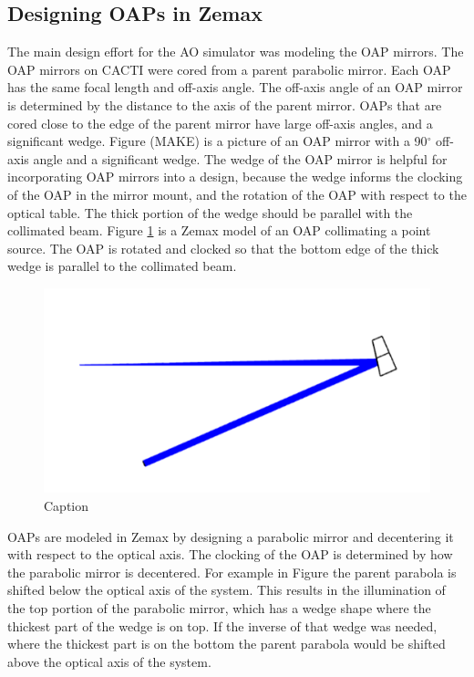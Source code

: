 
\subsection{Designing OAPs in Zemax}
The main design effort for the AO simulator was modeling the OAP mirrors. The OAP mirrors on CACTI were cored from a parent parabolic mirror. Each OAP has the same focal length and off-axis angle. The off-axis angle of an OAP mirror is determined by the distance to the axis of the parent mirror. OAPs that are cored close to the edge of the parent mirror have large off-axis angles, and a significant wedge. Figure (MAKE) is a picture of an OAP mirror with a 90$^{\circ}$ off-axis angle and a significant wedge. The wedge of the OAP mirror is helpful for incorporating OAP mirrors into a design, because the wedge informs the clocking of the OAP in the mirror mount, and the rotation of the OAP with respect to the optical table. The thick portion of the wedge should be parallel with the collimated beam. Figure \ref{fig:OAPcol} is a Zemax model of an OAP collimating a point source. The OAP is rotated and clocked so that the bottom edge of the thick wedge is parallel to the collimated beam. 


\begin{figure}
    \centering
    \includegraphics{Chapter Materials/Chapter Five Materials/OAPcollimate.png}
    \caption{Caption}
    \label{fig:OAPcol}
\end{figure}

OAPs are modeled in Zemax by designing a parabolic mirror and decentering it with respect to the optical axis. The clocking of the OAP is determined by how the parabolic mirror is decentered. For example in Figure  the parent parabola is shifted below the optical axis of the system. This results in the illumination of the top portion of the parabolic mirror, which has a wedge shape where the thickest part of the wedge is on top. If the inverse of that wedge was needed, where the thickest part is on the bottom the parent parabola would be shifted above the optical axis of the system. 

